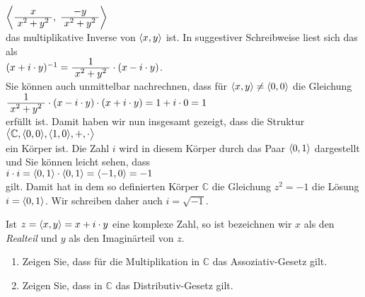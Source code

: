 \hspace*{1.3cm}
$\left\langle \bruch{x}{x^2 + y^2},\; \bruch{-y}{x^2 + y^2}\right\rangle$
\\[0.2cm]
das multiplikative Inverse von $\pair(x,y)$ ist.  In suggestiver Schreibweise liest sich das als
\\[0.2cm]
\hspace*{1.3cm}
$(x + i \cdot y)^{-1} = \bruch{1}{x^2 + y^2} \cdot (x  - i \cdot y)$.
\\[0.2cm]
Sie k\"{o}nnen auch unmittelbar nachrechnen, dass f\"{u}r $\pair(x,y) \not= \pair(0,0)$ die Gleichung
\\[0.2cm]
\hspace*{1.3cm}
$\bruch{1}{x^2 + y^2} \cdot (x  - i \cdot y) \cdot (x + i \cdot y) = 1 + i \cdot 0 = 1$ 
\\[0.2cm]
erf\"{u}llt ist.  Damit haben wir nun insgesamt gezeigt, dass die Struktur
\\[0.2cm]
\hspace*{1.3cm}
$\bigl\langle \mathbb{C}, \pair(0,0), \pair(1,0), +, \cdot \bigr\rangle$ 
\\[0.2cm]
ein K\"{o}rper ist.  Die Zahl $i$ wird in diesem K\"{o}rper durch das Paar $\pair(0,1)$ dargestellt und
Sie k\"{o}nnen leicht sehen, dass
\\[0.2cm]
\hspace*{1.3cm}
$i \cdot i = \pair(0,1) \cdot \pair(0,1) = \pair(-1,0) = -1$
\\[0.2cm]
gilt.  Damit hat in dem so definierten K\"{o}rper $\mathbb{C}$ die Gleichung $z^2 = -1$ die L\"{o}sung
$i = \pair(0,1)$.  Wir schreiben daher auch $i = \sqrt{-1}$.

Ist $z = \pair(x,y) = x + i \cdot y$ eine komplexe Zahl, so ist bezeichnen wir $x$ als den \emph{Realteil}
und $y$ als den Imagin\"{a}rteil von $z$.

\exercise
\renewcommand{\labelenumi}{(\alph{enumi})}
\begin{enumerate}
\item Zeigen Sie, dass f\"{u}r die Multiplikation in $\mathbb{C}$ das Assoziativ-Gesetz gilt.
\item Zeigen Sie, dass in $\mathbb{C}$ das Distributiv-Gesetz gilt. \exend
\end{enumerate}
\renewcommand{\labelenumi}{\arabic{enumi}.}


